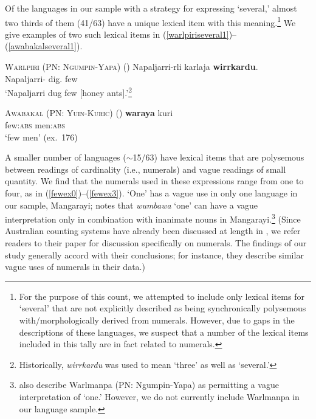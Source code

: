 \documentclass[12pt,egregdoesnotlikesansseriftitles]{scrartcl}
\begin{document}
Of the languages in our sample with a strategy for expressing `several,' almost two thirds of them (41/63) have a unique lexical item with this meaning.\footnote{For the purpose of this count, we attempted to include only lexical items for `several' that are not explicitly described as being synchronically polysemous with/morphologically derived from numerals. However, due to gaps in the descriptions of these languages, we suspect that a number of the lexical items included in this tally are in fact related to numerals.} We give examples of two such lexical items in (\ref{warlpiriseveral1})--(\ref{awabakalseveral1}).

\begin{exe}
  \ex \textsc{Warlpiri (PN: Ngumpin-Yapa)} \hfill(\citealt[9]{bowler17})
  \gll Napaljarri-rli karlaja \textbf{wirrkardu}.\\
  Napaljarri-\Erg{} dig.\Pst{} few\\
  \glt `Napaljarri dug few [honey ants].'\thinspace\footnote{Historically, \textit{wirrkardu} was used to mean `three' as well as `several.'} \label{warlpiriseveral1}
  
  \ex \textsc{Awabakal (PN: Yuin-Kuric)} \hfill(\citealt{lissarrague06})
  \gll \textbf{waraya}   kuri\\
  few:\textsc{abs} men:\textsc{abs}\\
  \glt `few men' (ex.\ 176)\label{awabakalseveral1}
\end{exe}

A smaller number of languages ($\sim$15/63) have lexical items that are polysemous between readings of cardinality (i.e., numerals) and vague readings of small quantity.  We find that the numerals used in these expressions range from one to four, as in (\ref{fewex0})--(\ref{fewex3}). `One' has a vague use in only one language in our sample, Mangarayi; \citet[93]{merlan89} notes that \textit{wumbawa} `one' can have a vague interpretation only in combination with inanimate nouns in Mangarayi.\footnote{\citet[143]{bowernzentz12} also describe Warlmanpa (PN: Ngumpin-Yapa) as permitting a vague interpretation of `one.' However, we do not currently include Warlmanpa in our language sample.} (Since Australian counting systems have already been discussed at length in \cite{bowernzentz12}, we refer readers to their paper for discussion specifically on numerals. The findings of our study generally accord with their conclusions; for instance, they describe similar vague uses of numerals in their data.)
\end{document}
